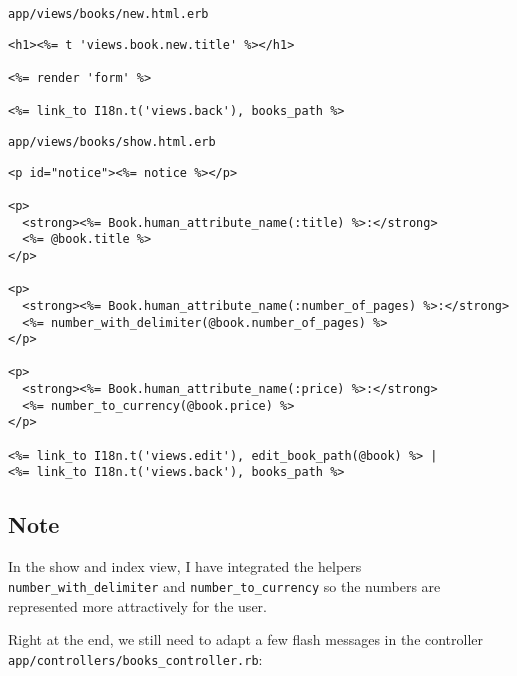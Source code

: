 \documentclass[a4paper]{book}
\begin{document}
\texttt{app/views/books/new.html.erb}

\begin{shaded}\begin{verbatim}
<h1><%= t 'views.book.new.title' %></h1>

<%= render 'form' %>

<%= link_to I18n.t('views.back'), books_path %>
\end{verbatim}\end{shaded}

\texttt{app/views/books/show.html.erb}

\begin{shaded}\begin{verbatim}
<p id="notice"><%= notice %></p>

<p>
  <strong><%= Book.human_attribute_name(:title) %>:</strong>
  <%= @book.title %>
</p>

<p>
  <strong><%= Book.human_attribute_name(:number_of_pages) %>:</strong>
  <%= number_with_delimiter(@book.number_of_pages) %>
</p>

<p>
  <strong><%= Book.human_attribute_name(:price) %>:</strong>
  <%= number_to_currency(@book.price) %>
</p>

<%= link_to I18n.t('views.edit'), edit_book_path(@book) %> |
<%= link_to I18n.t('views.back'), books_path %>
\end{verbatim}\end{shaded}

\subsection{Note}\label{note-47}

In the show and index view, I have integrated the helpers \texttt{number\_with\_delimiter} and \texttt{number\_to\_currency} so the numbers are represented more attractively for the user.

Right at the end, we still need to adapt a few flash messages in the controller \texttt{app/controllers/books\_controller.rb}:
\end{document}
